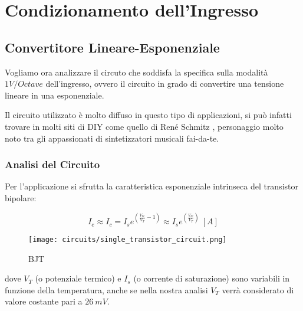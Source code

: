 \chapter{Condizionamento dell'Ingresso}


\section{Convertitore Lineare-Esponenziale}


Vogliamo ora analizzare il circuto che soddisfa la specifica sulla modalità $1V/Octave$
dell'ingresso, ovvero il circuito in grado di convertire una tensione lineare in una
esponenziale.

Il circuito utilizzato è molto diffuso in questo tipo di applicazioni, si può infatti
trovare in molti siti di DIY come quello di René Schmitz \cite{expo_converter}, personaggio
molto noto tra gli appassionati di sintetizzatori musicali fai-da-te.


\subsection*{Analisi del Circuito}


Per l'applicazione si sfrutta la caratteristica esponenziale intrinseca del transistor
bipolare:

\begin{displaymath}
    I_e\approx I_c=I_se^{\left(\frac{V_{be}}{V_T}-1\right)}
    \approx I_se^{\left(\frac{V_{be}}{V_T}\right)}\ [A]
\end{displaymath}

\begin{figure}[H]
    \centering
    \texttt{[image: circuits/single\_transistor\_circuit.png]}
    \caption{BJT}
    \label{bjt}
\end{figure}

dove $V_T$ (o potenziale termico) e $I_s$ (o corrente di saturazione) sono variabili in
funzione della temperatura, anche se nella nostra analisi $V_T$ verrà considerato di
valore costante pari a $26\ mV$.

